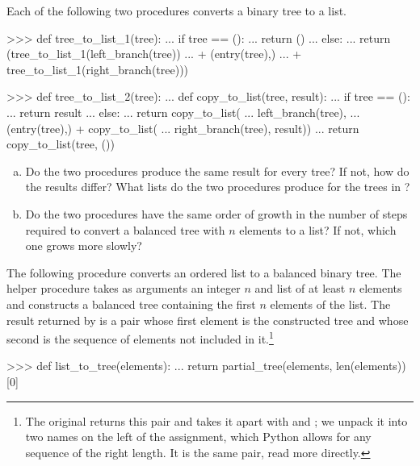 \begin{exerciseGroup}
\label{Exercise 2.63}
 Each of the following two
procedures converts a binary tree to a list.

\begin{codeBlock}
>>> def tree_to_list_1(tree):
...     if tree == ():
...         return ()
...     else:
...         return (tree_to_list_1(left_branch(tree))
...                 + (entry(tree),)
...                 + tree_to_list_1(right_branch(tree)))

>>> def tree_to_list_2(tree):
...     def copy_to_list(tree, result):
...         if tree == ():
...             return result
...         else:
...             return copy_to_list(
...                 left_branch(tree),
...                 (entry(tree),) + copy_to_list(
...                     right_branch(tree), result))
...     return copy_to_list(tree, ())
\end{codeBlock}

\begin{enumerate}[a.]

\item
Do the two procedures produce the same result for every tree?  If not, how do
the results differ?  What lists do the two procedures produce for the trees in
?

\item
Do the two procedures have the same order of growth in the number of steps
required to convert a balanced tree with \( n \) elements to a list?  If not,
which one grows more slowly?

\end{enumerate}

\label{Exercise 2.64}
 The following procedure
 converts an ordered list to a balanced binary tree.  The
helper procedure  takes as arguments an integer \( n \) and
list of at least \( n \) elements and constructs a balanced tree containing the
first \( n \) elements of the list.  The result returned by
 is a pair whose first element is the constructed tree and
whose second is the sequence of elements not included in it.\footnote{The
original returns this pair and takes it apart with  and ;
we unpack it into two names on the left of the assignment, which Python allows
for any sequence of the right length.  It is the same pair, read more
directly.}

\begin{codeBlock}
>>> def list_to_tree(elements):
...     return partial_tree(elements, len(elements))[0]


\end{codeBlock}
\end{exerciseGroup}
